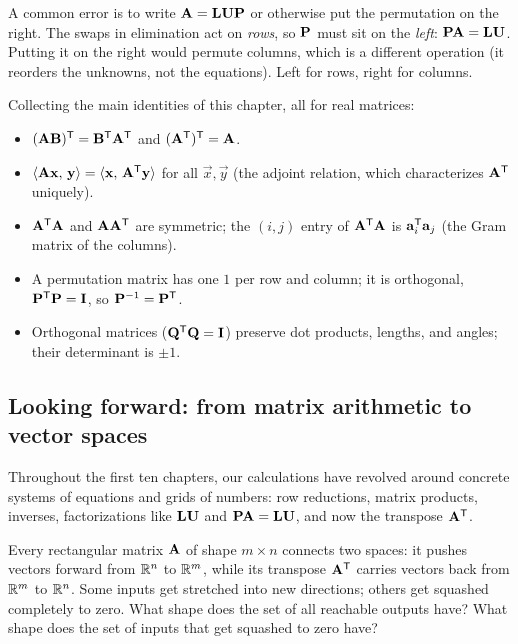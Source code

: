 \begin{trapbox}
A common error is to write $\mathbf{A}=\mathbf{L}\mathbf{U}\mathbf{P}$ or otherwise put the permutation
on the right. The swaps in elimination act on \emph{rows}, so $\mathbf{P}$ must sit on the \emph{left}:
$\mathbf{P}\mathbf{A}=\mathbf{L}\mathbf{U}$. Putting it on the right would permute columns, which is a different
operation (it reorders the unknowns, not the equations). Left for rows, right for columns.
\end{trapbox}

\begin{formalbox}
Collecting the main identities of this chapter, all for real matrices:
\begin{itemize}
  \item $(\mathbf{A}\mathbf{B})^{\mathsf{T}}=\mathbf{B}^{\mathsf{T}}\mathbf{A}^{\mathsf{T}}$ and $(\mathbf{A}^{\mathsf{T}})^{\mathsf{T}}=\mathbf{A}$.
  \item $\langle \mathbf{A}\mathbf{x},\, \mathbf{y} \rangle=\langle \mathbf{x},\, \mathbf{A}^{\mathsf{T}}\mathbf{y} \rangle$ for all $\vec{x},\vec{y}$
        (the adjoint relation, which characterizes $\mathbf{A}^{\mathsf{T}}$ uniquely).
  \item $\mathbf{A}^{\mathsf{T}}\mathbf{A}$ and $\mathbf{A}\mathbf{A}^{\mathsf{T}}$ are symmetric; the $(i,j)$ entry of $\mathbf{A}^{\mathsf{T}}\mathbf{A}$
        is $\mathbf{a}_i^{\mathsf{T}}\mathbf{a}_j$ (the Gram matrix of the columns).
  \item A permutation matrix has one $1$ per row and column; it is orthogonal,
        $\mathbf{P}^{\mathsf{T}}\mathbf{P}=\mathbf{I}$, so $\mathbf{P}^{-1}=\mathbf{P}^{\mathsf{T}}$.
  \item Orthogonal matrices ($\mathbf{Q}^{\mathsf{T}}\mathbf{Q}=\mathbf{I}$) preserve dot products, lengths, and angles;
        their determinant is $\pm 1$.
\end{itemize}
\end{formalbox}

\subsection{Looking forward: from matrix arithmetic to vector spaces}

Throughout the first ten chapters, our calculations have revolved around concrete systems of equations
and grids of numbers: row reductions, matrix products, inverses, factorizations like $\mathbf{L}\mathbf{U}$
and $\mathbf{P}\mathbf{A}=\mathbf{L}\mathbf{U}$, and now the transpose $\mathbf{A}^{\mathsf{T}}$.

Every rectangular matrix $\mathbf{A}$ of shape $m\times n$ connects two spaces:
it pushes vectors forward from $\mathbb{R}^n$ to $\mathbb{R}^m$, while its transpose $\mathbf{A}^{\mathsf{T}}$ carries vectors back
from $\mathbb{R}^m$ to $\mathbb{R}^n$. Some inputs get stretched into new directions; others get squashed completely to zero.
What shape does the set of all reachable outputs have? What shape does the set of inputs that get
squashed to zero have?

